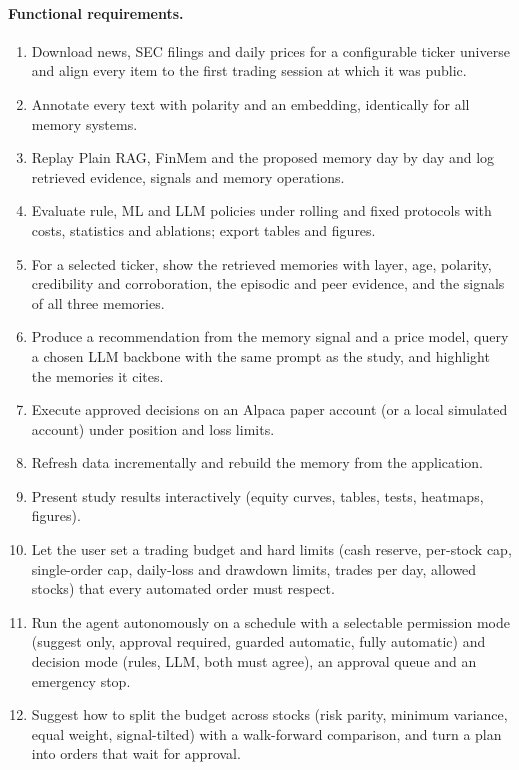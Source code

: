 \paragraph{Functional requirements.}
\begin{enumerate}
  \item[FR1] Download news, SEC filings and daily prices for a configurable ticker universe and align every item to the first trading session at which it was public.
  \item[FR2] Annotate every text with polarity and an embedding, identically for all memory systems.
  \item[FR3] Replay Plain RAG, FinMem and the proposed memory day by day and log retrieved evidence, signals and memory operations.
  \item[FR4] Evaluate rule, ML and LLM policies under rolling and fixed protocols with costs, statistics and ablations; export tables and figures.
  \item[FR5] For a selected ticker, show the retrieved memories with layer, age, polarity, credibility and corroboration, the episodic and peer evidence, and the signals of all three memories.
  \item[FR6] Produce a recommendation from the memory signal and a price model, query a chosen LLM backbone with the same prompt as the study, and highlight the memories it cites.
  \item[FR7] Execute approved decisions on an Alpaca paper account (or a local simulated account) under position and loss limits.
  \item[FR8] Refresh data incrementally and rebuild the memory from the application.
  \item[FR9] Present study results interactively (equity curves, tables, tests, heatmaps, figures).
  \item[FR10] Let the user set a trading budget and hard limits (cash reserve, per-stock cap, single-order cap, daily-loss and drawdown limits, trades per day, allowed stocks) that every automated order must respect.
  \item[FR11] Run the agent autonomously on a schedule with a selectable permission mode (suggest only, approval required, guarded automatic, fully automatic) and decision mode (rules, LLM, both must agree), an approval queue and an emergency stop.
  \item[FR12] Suggest how to split the budget across stocks (risk parity, minimum variance, equal weight, signal-tilted) with a walk-forward comparison, and turn a plan into orders that wait for approval.

\end{enumerate}
